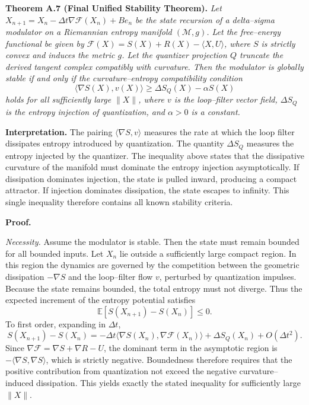 \medskip

\textbf{Theorem A.7 (Final Unified Stability Theorem).}  
\emph{Let \(X_{n+1} = X_n - \Delta t \nabla \mathcal{F}(X_n) + B e_n\) be the state recursion of a delta–sigma modulator on a Riemannian entropy manifold \((\mathcal{M},g)\). Let the free–energy functional be given by \(\mathcal{F}(X) = S(X) + R(X) - \langle X, U\rangle\), where \(S\) is strictly convex and induces the metric \(g\). Let the quantizer projection \(Q\) truncate the derived tangent complex compatibly with curvature. Then the modulator is globally stable if and only if the curvature–entropy compatibility condition}
\[
\langle \nabla S(X), v(X) \rangle \ge \Delta S_Q(X) - \alpha S(X)
\]
\emph{holds for all sufficiently large \(\|X\|\), where \(v\) is the loop–filter vector field, \(\Delta S_Q\) is the entropy injection of quantization, and \(\alpha>0\) is a constant.}

\medskip

\textbf{Interpretation.}  
The pairing \(\langle \nabla S, v\rangle\) measures the rate at which the loop filter dissipates entropy introduced by quantization. The quantity \(\Delta S_Q\) measures the entropy injected by the quantizer. The inequality above states that the dissipative curvature of the manifold must dominate the entropy injection asymptotically. If dissipation dominates injection, the state is pulled inward, producing a compact attractor. If injection dominates dissipation, the state escapes to infinity. This single inequality therefore contains all known stability criteria.

\medskip

\textbf{Proof.}

\emph{Necessity.}  
Assume the modulator is stable. Then the state must remain bounded for all bounded inputs. Let \(X_n\) lie outside a sufficiently large compact region. In this region the dynamics are governed by the competition between the geometric dissipation \(-\nabla S\) and the loop–filter flow \(v\), perturbed by quantization impulses. Because the state remains bounded, the total entropy must not diverge. Thus the expected increment of the entropy potential satisfies
\[
\mathbb{E}\left[S(X_{n+1}) - S(X_n)\right] \le 0.
\]
To first order, expanding in \(\Delta t\),
\[
S(X_{n+1}) - S(X_n) = -\Delta t \langle \nabla S(X_n), \nabla\mathcal{F}(X_n) \rangle + \Delta S_Q(X_n) + O(\Delta t^2).
\]
Since \(\nabla\mathcal{F} = \nabla S + \nabla R - U\), the dominant term in the asymptotic region is \(-\langle\nabla S,\nabla S\rangle\), which is strictly negative. Boundedness therefore requires that the positive contribution from quantization not exceed the negative curvature–induced dissipation. This yields exactly the stated inequality for sufficiently large \(\|X\|\).


